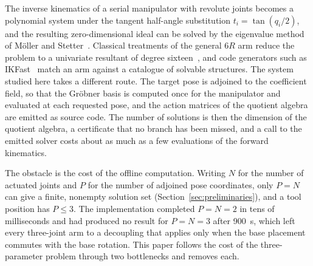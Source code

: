 \documentclass[11pt,a4paper]{article}
\theoremstyle{plain}
\theoremstyle{definition}
\theoremstyle{remark}
\begin{document}
The inverse kinematics of a serial manipulator with revolute joints becomes a polynomial system under
the tangent half-angle substitution $t_i = \tan(q_i/2)$, and the resulting zero-dimensional ideal can
be solved by the eigenvalue method of M\"oller and Stetter~\cite{moller1995}. Classical treatments of
the general $6R$ arm reduce the problem to a univariate resultant of degree
sixteen~\cite{leeliang1988,raghavanroth1993,manochacanny1994,husty2007}, and code generators such as
IKFast~\cite{diankov2010} match an arm against a catalogue of solvable structures. The system studied
here takes a different route. The target pose is adjoined to the coefficient field, so that the
Gr\"obner basis is computed once for the manipulator and evaluated at each requested pose, and the
action matrices of the quotient algebra are emitted as source code. The number of solutions is then
the dimension of the quotient algebra, a certificate that no branch has been missed, and a call to the
emitted solver costs about as much as a few evaluations of the forward kinematics.

The obstacle is the cost of the offline computation. Writing $N$ for the number of actuated joints and
$P$ for the number of adjoined pose coordinates, only $P = N$ can give a finite, nonempty solution set
(Section~\ref{sec:preliminaries}), and a tool position has $P \le 3$. The implementation completed
$P = N = 2$ in tens of milliseconds and had produced no result for $P = N = 3$ after
\SI{900}{\second}, which left every three-joint arm to a decoupling that applies only when the base
placement commutes with the base rotation. This paper follows the cost of the three-parameter
problem through two bottlenecks and removes each.
\end{document}
